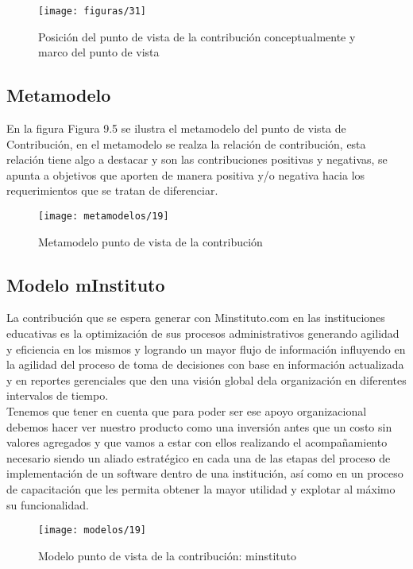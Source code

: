    \begin{figure}[H]
   	\centering
   	\texttt{[image: figuras/31]}
   	\captionsetup{width=.95\textwidth}
   	\caption{Posición del punto de vista de la contribución conceptualmente y marco del punto de vista}
   	\label{figura31}
   \end{figure}
   
   \subsection{Metamodelo}
   En la figura Figura 9.5 se ilustra el metamodelo del punto de vista de Contribución, en el metamodelo se realza la relación de contribución, esta relación tiene algo a destacar y son las contribuciones positivas y negativas, se apunta a objetivos que aporten de manera positiva y/o negativa hacia los requerimientos que se tratan de diferenciar.
   
   \begin{figure}[H]
   	\centering
   	\texttt{[image: metamodelos/19]}
   	\captionsetup{width=.95\textwidth}
   	\caption{Metamodelo punto de vista de la contribución}
   	\label{figura19}
   \end{figure}
   
   \subsection{Modelo mInstituto}
  La contribución que se espera generar con Minstituto.com en las instituciones educativas es la optimización de sus procesos administrativos generando agilidad y eficiencia en los mismos y logrando un mayor flujo de información influyendo en la agilidad del proceso de toma de decisiones con base en información actualizada y en reportes gerenciales que den una visión global dela organización en diferentes intervalos de tiempo. \\
  
  Tenemos que tener en cuenta que para poder ser ese apoyo organizacional debemos hacer ver nuestro producto como una inversión antes que un costo sin valores agregados y que vamos a estar con ellos realizando el acompañamiento necesario siendo un aliado estratégico en cada una de las etapas del proceso de implementación de un software dentro de una institución, así como en un proceso de capacitación que les permita obtener la mayor utilidad y explotar al máximo su funcionalidad.
   \begin{figure}[H]
   	\centering
   	\texttt{[image: modelos/19]}
   	\captionsetup{width=.95\textwidth}
   	\caption{Modelo punto de vista de la contribución: minstituto}
   	\label{modelo19}
   \end{figure}
   
